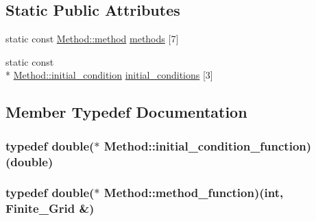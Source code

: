 \subsection*{Static Public Attributes}
\begin{DoxyCompactItemize}
\item 
static const \hyperlink{structMethod_1_1method}{Method\-::method} \hyperlink{classMethod_af977667f5061f219d7ea8ad1262a6e71}{methods} \mbox{[}7\mbox{]}
\item 
static const \\*
\hyperlink{structMethod_1_1initial__condition}{Method\-::initial\-\_\-condition} \hyperlink{classMethod_aac08bb2a7106de6043c82fdd5511626a}{initial\-\_\-conditions} \mbox{[}3\mbox{]}
\end{DoxyCompactItemize}


\subsection{Member Typedef Documentation}
\hypertarget{classMethod_aa5f32411bc120712a9b4e780f593ccf0}{
\subsubsection[{initial\-\_\-condition\-\_\-function}]{\setlength{\rightskip}{0pt plus 5cm}typedef double($\ast$ Method\-::initial\-\_\-condition\-\_\-function)(double)}}\label{classMethod_aa5f32411bc120712a9b4e780f593ccf0}
\hypertarget{classMethod_a3aa0940bc4e4fdc07d065851cc8f7800}{
\subsubsection[{method\-\_\-function}]{\setlength{\rightskip}{0pt plus 5cm}typedef double($\ast$ Method\-::method\-\_\-function)(int, {\bf Finite\-\_\-\-Grid} \&)}}\label{classMethod_a3aa0940bc4e4fdc07d065851cc8f7800}


